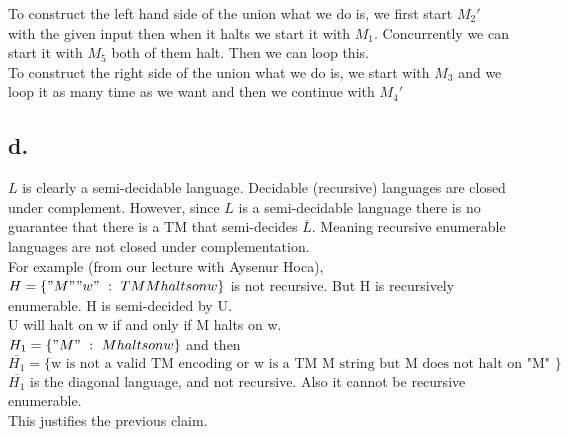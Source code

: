 \documentclass[12pt]{article}
\begin{document}
To construct the left hand side of the union what we do is, we first start $M_2'$ with the given input then when it halts we start it with $M_1$. Concurrently we can start it with $M_5$ both of them halt. Then we can loop this. \\

To construct the right side of the union what we do is, we start with $M_3$ and we loop it as many time as we want and then we continue with $M_4'$ \\


 
 





\subsection*{d.}
$L$ is clearly a semi-decidable language. Decidable (recursive) languages are closed under complement. However, since $L$ is a semi-decidable language there is no guarantee that there is a TM that semi-decides $\overline{L}$. Meaning recursive enumerable languages are not closed under complementation. \\
For example (from our lecture with Aysenur Hoca), \\
$H=\{"M""w"\ :\ TM M halts on w \}$ is not recursive. But H is recursively enumerable. H is semi-decided by U. \\
U will halt on w if and only if M halts on w. \\
$H_1=\{"M"\ :\ M halts on w \}$ and then \\
$\overline{H_1}=\{ \text{w is not a valid TM encoding or w is a TM M string but M does not halt on "M" } \}$ \\
$\overline{H_1}$ is the diagonal language, and not recursive. Also it cannot be recursive enumerable. \\
This justifies the previous claim.

\end{document}
